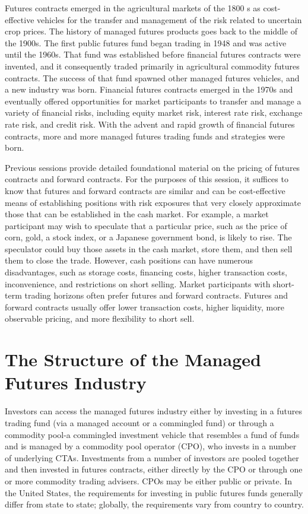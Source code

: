 \documentclass[11pt]{article}
\begin{document}
Futures contracts emerged in the agricultural markets of the 1800 s as cost-effective vehicles for the transfer and management of the risk related to uncertain crop prices. The history of managed futures products goes back to the middle of the 1900s. The first public futures fund began trading in 1948 and was active until the 1960s. That fund was established before financial futures contracts were invented, and it consequently traded primarily in agricultural commodity futures contracts. The success of that fund spawned other managed futures vehicles, and a new industry was born. Financial futures contracts emerged in the 1970s and eventually offered opportunities for market participants to transfer and manage a variety of financial risks, including equity market risk, interest rate risk, exchange rate risk, and credit risk. With the advent and rapid growth of financial futures contracts, more and more managed futures trading funds and strategies were born.

Previous sessions provide detailed foundational material on the pricing of futures contracts and forward contracts. For the purposes of this session, it suffices to know that futures and forward contracts are similar and can be cost-effective means of establishing positions with risk exposures that very closely approximate those that can be established in the cash market. For example, a market participant may wish to speculate that a particular price, such as the price of corn, gold, a stock index, or a Japanese government bond, is likely to rise. The speculator could buy those assets in the cash market, store them, and then sell them to close the trade. However, cash positions can have numerous disadvantages, such as storage costs, financing costs, higher transaction costs, inconvenience, and restrictions on short selling. Market participants with short-term trading horizons often prefer futures and forward contracts. Futures and forward contracts usually offer lower transaction costs, higher liquidity, more observable pricing, and more flexibility to short sell.

\section*{The Structure of the Managed Futures Industry}
Investors can access the managed futures industry either by investing in a futures trading fund (via a managed account or a commingled fund) or through a commodity pool-a commingled investment vehicle that resembles a fund of funds and is managed by a commodity pool operator (CPO), who invests in a number of underlying CTAs. Investments from a number of investors are pooled together and then invested in futures contracts, either directly by the CPO or through one or more commodity trading advisers. CPOs may be either public or private. In the United States, the requirements for investing in public futures funds generally differ from state to state; globally, the requirements vary from country to country.
\end{document}
